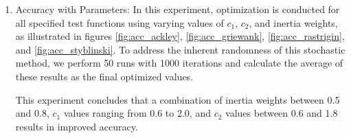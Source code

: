 \documentclass[paper,revised]{geophysics}
\begin{document}
\begin{enumerate}
	\item Accuracy with Parameters: In this experiment, optimization is conducted for all specified test functions using varying values of \(c_1\), \(c_2\), and inertia weights, as illustrated in figures \ref{fig:acc_ackley}, \ref{fig:acc_griewank}, \ref{fig:acc_rastrigin}, and \ref{fig:acc_styblinski}. To address the inherent randomness of this stochastic method, we perform 50 runs with 1000 iterations and calculate the average of these results as the final optimized values. 
	
This experiment concludes that a combination of inertia weights between 0.5 and 0.8, \(c_1\) values ranging from 0.6 to 2.0, and \(c_2\) values between 0.6 and 1.8 results in improved accuracy. 


\end{enumerate}
\end{document}
